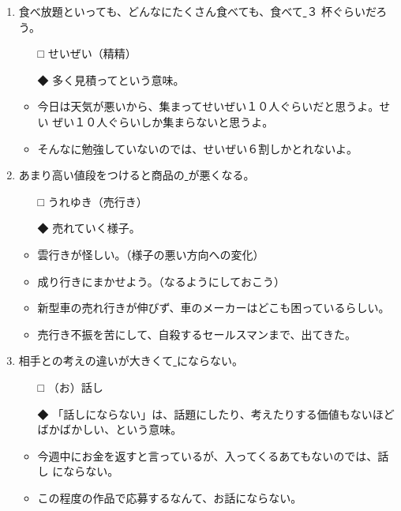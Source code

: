 \documentclass[
uplatex,
b5paper,
10pt,
dvipdfmx
]{jsbook}
\begin{document}
\begin{enumerate}
\item 食べ放題といっても、どんなにたくさん食べても、食べて\underline{    }３
      杯ぐらいだろう。
\begin{itemize}
\item[□] せいぜい（精精）
\item[◆] 多く見積ってという意味。
\end{itemize}
\begin{itemize}
\item 今日は天気が悪いから、集まってせいぜい１０人ぐらいだと思うよ。せい
      ぜい１０人ぐらいしか集まらないと思うよ。
\item そんなに勉強していないのでは、せいぜい６割しかとれないよ。
\end{itemize}

\item あまり高い値段をつけると商品の\underline{    }が悪くなる。
\begin{itemize}
\item[□] うれゆき（売行き）
\item[◆] 売れていく様子。
\end{itemize}
\begin{itemize}
\item 雲行きが怪しい。（様子の悪い方向への変化）
\item 成り行きにまかせよう。（なるようにしておこう）
\item 新型車の売れ行きが伸びず、車のメーカーはどこも困っているらしい。
\item 売行き不振を苦にして、自殺するセールスマンまで、出てきた。
\end{itemize}

\item 相手との考えの違いが大きくて\underline{    }にならない。
\begin{itemize}
\item[□] （お）話し
\item[◆] 「話しにならない」は、話題にしたり、考えたりする価値もないほど
	  ばかばかしい、という意味。
\end{itemize}
\begin{itemize}
\item 今週中にお金を返すと言っているが、入ってくるあてもないのでは、話し
      にならない。
\item この程度の作品で応募するなんて、お話にならない。
\end{itemize}


\end{enumerate}
\end{document}
